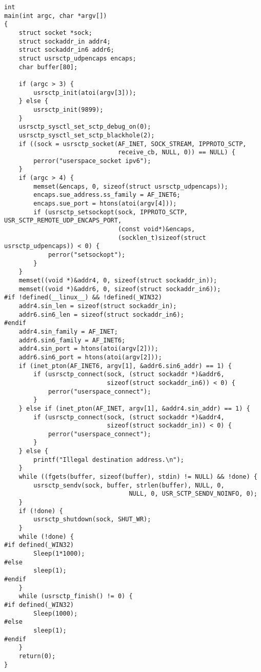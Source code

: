 \documentclass[a4paper]{article}
\begin{document}
\begin{verbatim}
int
main(int argc, char *argv[])
{
    struct socket *sock;
    struct sockaddr_in addr4;
    struct sockaddr_in6 addr6;
    struct usrsctp_udpencaps encaps;
    char buffer[80];

    if (argc > 3) {
        usrsctp_init(atoi(argv[3]));
    } else {
        usrsctp_init(9899);
    }
    usrsctp_sysctl_set_sctp_debug_on(0);
    usrsctp_sysctl_set_sctp_blackhole(2);
    if ((sock = usrsctp_socket(AF_INET, SOCK_STREAM, IPPROTO_SCTP, 
                               receive_cb, NULL, 0)) == NULL) {
        perror("userspace_socket ipv6");
    }
    if (argc > 4) {
        memset(&encaps, 0, sizeof(struct usrsctp_udpencaps));
        encaps.sue_address.ss_family = AF_INET6;
        encaps.sue_port = htons(atoi(argv[4]));
        if (usrsctp_setsockopt(sock, IPPROTO_SCTP, USR_SCTP_REMOTE_UDP_ENCAPS_PORT, 
                               (const void*)&encaps, 
                               (socklen_t)sizeof(struct usrsctp_udpencaps)) < 0) {
            perror("setsockopt");
        }
    }
    memset((void *)&addr4, 0, sizeof(struct sockaddr_in));
    memset((void *)&addr6, 0, sizeof(struct sockaddr_in6));
#if !defined(__linux__) && !defined(_WIN32)
    addr4.sin_len = sizeof(struct sockaddr_in);
    addr6.sin6_len = sizeof(struct sockaddr_in6);
#endif
    addr4.sin_family = AF_INET;
    addr6.sin6_family = AF_INET6;
    addr4.sin_port = htons(atoi(argv[2]));
    addr6.sin6_port = htons(atoi(argv[2]));
    if (inet_pton(AF_INET6, argv[1], &addr6.sin6_addr) == 1) {
        if (usrsctp_connect(sock, (struct sockaddr *)&addr6, 
                            sizeof(struct sockaddr_in6)) < 0) {
            perror("userspace_connect");
        }
    } else if (inet_pton(AF_INET, argv[1], &addr4.sin_addr) == 1) {
        if (usrsctp_connect(sock, (struct sockaddr *)&addr4, 
                            sizeof(struct sockaddr_in)) < 0) {
            perror("userspace_connect");
        }
    } else {
        printf("Illegal destination address.\n");
    }
    while ((fgets(buffer, sizeof(buffer), stdin) != NULL) && !done) {
        usrsctp_sendv(sock, buffer, strlen(buffer), NULL, 0,
				                  NULL, 0, USR_SCTP_SENDV_NOINFO, 0);
    }
    if (!done) {
        usrsctp_shutdown(sock, SHUT_WR);
    }
    while (!done) {
#if defined(_WIN32)
        Sleep(1*1000);
#else
        sleep(1);
#endif
    }
    while (usrsctp_finish() != 0) {
#if defined(_WIN32)
        Sleep(1000);
#else
        sleep(1);
#endif
    }
    return(0);
}

\end{verbatim}

\end{document}
